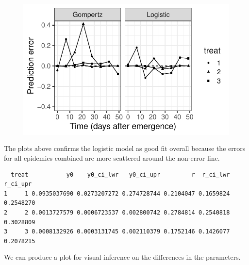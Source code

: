 \documentclass[
  letterpaper,
  DIV=11,
  numbers=noendperiod]{scrreprt}
\newenvironment{Shaded}{\begin{snugshade}}{\end{snugshade}}
\newcommand{\FunctionTok}[1]{\textcolor[rgb]{0.28,0.35,0.67}{#1}}
\newcommand{\NormalTok}[1]{\textcolor[rgb]{0.00,0.23,0.31}{#1}}
\newcommand{\SpecialCharTok}[1]{\textcolor[rgb]{0.37,0.37,0.37}{#1}}
\newcommand{\StringTok}[1]{\textcolor[rgb]{0.13,0.47,0.30}{#1}}
\begin{document}
\begin{figure}[H]

{\centering \includegraphics{./temporal-fitting_files/figure-pdf/unnamed-chunk-22-1.pdf}

}

\end{figure}

The plots above confirms the logistic model as good fit overall because
the errors for all epidemics combined are more scattered around the
non-error line.

\begin{Shaded}
\end{Shaded}

\begin{verbatim}
  treat           y0    y0_ci_lwr   y0_ci_upr         r  r_ci_lwr  r_ci_upr
1     1 0.0935037690 0.0273207272 0.274728744 0.2104047 0.1659824 0.2548270
2     2 0.0013727579 0.0006723537 0.002800742 0.2784814 0.2540818 0.3028809
3     3 0.0008132926 0.0003131745 0.002110379 0.1752146 0.1426077 0.2078215
\end{verbatim}

We can produce a plot for visual inference on the differences in the
parameters.
\end{document}
